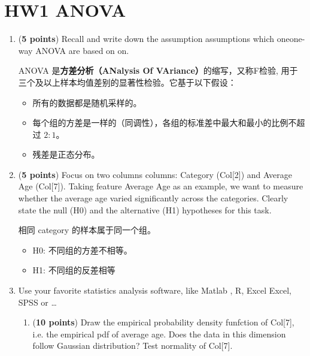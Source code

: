 \documentclass[degree=project, degree-type=project]{thuthesis}
\begin{document}
\maketitle
\frontmatter
% 

\tableofcontents


\mainmatter

\chapter{HW1 ANOVA}

\begin{enumerate}
  \item (\textbf{5 points}) Recall and write down the assumption assumptions which oneone-way ANOVA are based on on.

    ANOVA 是\textbf{方差分析（ANalysis Of VAriance）}的缩写，又称F检验, 用于三个及以上样本均值差别的显著性检验。它基于以下假设：
    \begin{itemize}
      \item 所有的数据都是随机采样的。
      \item 每个组的方差是一样的（同调性），各组的标准差中最大和最小的比例不超过 $2:1$。
      \item 残差是正态分布。
    \end{itemize}
  \item (\textbf{5 points}) Focus on two columns columns: Category (Col[2]) and Average Age (Col[7]). Taking feature Average Age as an example, we want to measure whether the average age varied significantly across the categories. Clearly state the null (H0) and the alternative (H1) hypotheses for this task.

    相同 category 的样本属于同一个组。
    \begin{itemize}
      \item H0: 不同组的方差不相等。
      \item H1: 不同组的反差相等
     \end{itemize}

   \item Use your favorite statistics analysis software, like Matlab , R, Excel Excel, SPSS or …
     \begin{enumerate}
       \item (\textbf{10 points}) Draw the empirical probability density funfction of Col[7], i.e. the empirical pdf of average age. Does the data in this dimension follow Gaussian distribution? Test normality of Col[7].


\end{enumerate}
\end{enumerate}
\end{document}
